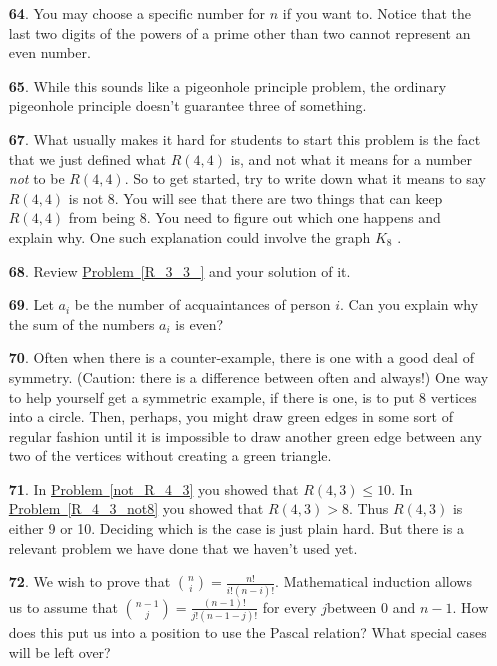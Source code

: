 \documentclass[10pt,]{book}
\theoremstyle{plain}
\theoremstyle{definition}
\theoremstyle{definition}
\numberwithin{equation}{chapter}
\newcommand{\gt}{>}
\begin{document}
\begin{itemize}[itemsep=1em]
\item[\textbf{64}.]\hypertarget{p-382}{}%
You may choose a specific number for \(n\) if you want to. Notice that the last two digits of the powers of a prime other than two cannot represent an even number.%

\item[\textbf{65}.]\hypertarget{p-385}{}%
While this sounds like a pigeonhole principle problem, the ordinary pigeonhole principle doesn't guarantee three of something.%

\item[\textbf{67}.]\hypertarget{p-393}{}%
What usually makes it hard for students to start this problem is the fact that we just defined what \(R(4, 4)\) is, and not what it means for a number \emph{not} to be \(R(4, 4)\). So to get started, try to write down what it means to say \(R(4, 4)\) is not 8. You will see that there are two things that can keep \(R(4, 4)\) from being 8. You need to figure out which one happens and explain why. One such explanation could involve the graph \(K_8\) .%

\item[\textbf{68}.]\hypertarget{p-396}{}%
Review \hyperref[R_3_3_]{Problem~\ref{R_3_3_}} and your solution of it.%

\item[\textbf{69}.]\hypertarget{p-399}{}%
Let \(a_i\) be the number of acquaintances of person \(i\). Can you explain why the sum of the numbers \(a_i\) is even?%

\item[\textbf{70}.]\hypertarget{p-402}{}%
Often when there is a counter-example, there is one with a good deal of symmetry. (Caution: there is a difference between often and always!) One way to help yourself get a symmetric example, if there is one, is to put 8 vertices into a circle. Then, perhaps, you might draw green edges in some sort of regular fashion until it is impossible to draw another green edge between any two of the vertices without creating a green triangle.%

\item[\textbf{71}.]\hypertarget{p-405}{}%
In \hyperref[not_R_4_3]{Problem~\ref{not_R_4_3}} you showed that \(R(4, 3) \le 10\). In \hyperref[R_4_3_not8]{Problem~\ref{R_4_3_not8}} you showed that \(R(4, 3) \gt 8\). Thus \(R(4, 3)\) is either 9 or 10. Deciding which is the case is just plain hard. But there is a relevant problem we have done that we haven't used yet.%

\item[\textbf{72}.]\hypertarget{p-449}{}%
We wish to prove that \(\binom{n}{i} =\frac{n!}{i!(n-i)!}\). Mathematical induction allows us to assume that \(\binom{n-1}{j}=\frac{(n-1)!}{j! (n-1-j)!}\) for every \(j\)between 0 and \(n-1\). How does this put us into a position to use the Pascal relation? What special cases will be left over?%


\end{itemize}
\end{document}
